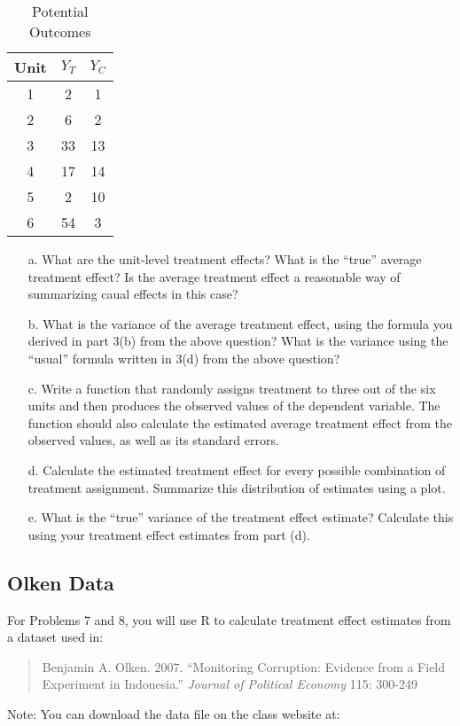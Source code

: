 \documentclass{article}
\begin{document}
\begin{table}[!h]
		\caption{Potential Outcomes}
	\begin{center}
		\begin{tabular}{ccc}
			Unit & $Y_T$ & $Y_C$ \\ \hline  
			1    & 2     & 1     \\ 
			2    & 6     & 2     \\ 
			3    & 33    & 13    \\ 
			4    & 17    & 14    \\ 
			5   &  2     &  10     \\ 
			 6  & 54    &  3 \\     
		\end{tabular}
		\label{}
	\end{center}
\end{table}


\begin{itemize}
\item[a.] What are the unit-level treatment effects? What is the ``true''
  average treatment effect? Is the average treatment effect a reasonable way
  of summarizing caual effects in this case? 
\item[b.]   What is the variance of the average treatment effect, using
  the formula you derived in part 3(b) from the above question? What is
  the variance using the ``usual'' formula written in 3(d) from the
  above question?
  \item[c.] Write a function that randomly assigns treatment to three out of
  the six units and then  produces the observed values of the dependent
  variable. The function should also calculate the estimated average
  treatment effect from the observed values, as well as its standard
  errors.
\item[d.] Calculate the estimated treatment effect for
  every possible combination of treatment assignment. Summarize this distribution of estimates using a plot.
\item[e.] What is the ``true'' variance of the treatment effect estimate? Calculate this using your treatment effect estimates from part (d).
\end{itemize}

\subsection*{Olken Data}
For Problems 7 and 8, you will use R to calculate
treatment effect estimates from a dataset used in:
\begin{quote}
  Benjamin A. Olken. 2007. ``Monitoring Corruption: Evidence from a
  Field Experiment in Indonesia.'' \textit{Journal of Political
    Economy} 115: 300-249
\end{quote}
Note: You can download the data file on the class website at:
\end{document}
